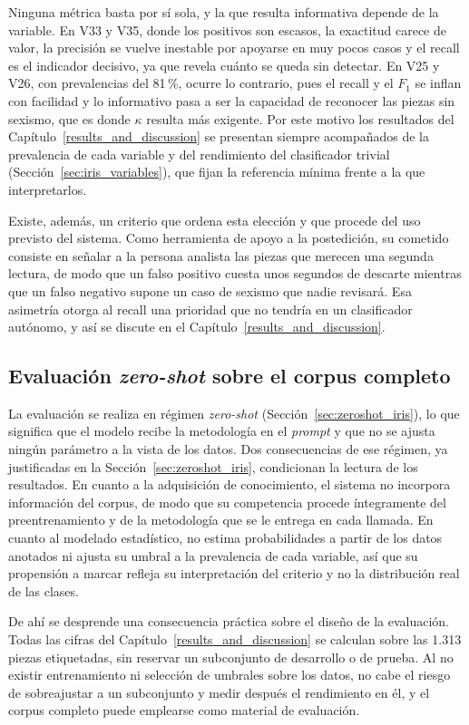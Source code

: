 Ninguna métrica basta por sí sola, y la que resulta informativa depende de la
variable. En V33 y V35, donde los positivos son escasos, la exactitud carece de
valor, la precisión se vuelve inestable por apoyarse en muy pocos casos y el
recall es el indicador decisivo, ya que revela cuánto se queda sin detectar. En
V25 y V26, con prevalencias del 81\,\%, ocurre lo contrario, pues el recall y el
$F_1$ se inflan con facilidad y lo informativo pasa a ser la capacidad de
reconocer las piezas sin sexismo, que es donde $\kappa$ resulta más exigente. Por
este motivo los resultados del Capítulo~\ref{results_and_discussion} se presentan
siempre acompañados de la prevalencia de cada variable y del rendimiento del
clasificador trivial (Sección~\ref{sec:iris_variables}), que fijan la referencia
mínima frente a la que interpretarlos.

Existe, además, un criterio que ordena esta elección y que procede del uso
previsto del sistema. Como herramienta de apoyo a la postedición, su cometido
consiste en señalar a la persona analista las piezas que merecen una segunda
lectura, de modo que un falso positivo cuesta unos segundos de descarte mientras
que un falso negativo supone un caso de sexismo que nadie revisará. Esa asimetría
otorga al recall una prioridad que no tendría en un clasificador autónomo, y así se
discute en el Capítulo~\ref{results_and_discussion}.


\subsection{Evaluación \textit{zero-shot} sobre el corpus completo}

La evaluación se realiza en régimen \textit{zero-shot}
(Sección~\ref{sec:zeroshot_iris}), lo que significa que el modelo recibe la
metodología en el \textit{prompt} y que no se ajusta ningún parámetro a la vista
de los datos. Dos consecuencias de ese régimen, ya justificadas en la
Sección~\ref{sec:zeroshot_iris}, condicionan la lectura de los resultados. En
cuanto a la adquisición de conocimiento, el sistema no incorpora información del corpus, de modo que su competencia procede íntegramente del preentrenamiento y de la
metodología que se le entrega en cada llamada. En cuanto al modelado estadístico,
no estima probabilidades a partir de los datos anotados ni ajusta su umbral a la
prevalencia de cada variable, así que su propensión a marcar refleja su
interpretación del criterio y no la distribución real de las clases.

De ahí se desprende una consecuencia práctica sobre el diseño de la evaluación.
Todas las cifras del Capítulo~\ref{results_and_discussion} se calculan sobre las
1.313 piezas etiquetadas, sin reservar un subconjunto de desarrollo o de prueba.
Al no existir entrenamiento ni selección de umbrales sobre los datos, no cabe el
riesgo de sobreajustar a un subconjunto y medir después el rendimiento en él, y el
corpus completo puede emplearse como material de evaluación.


